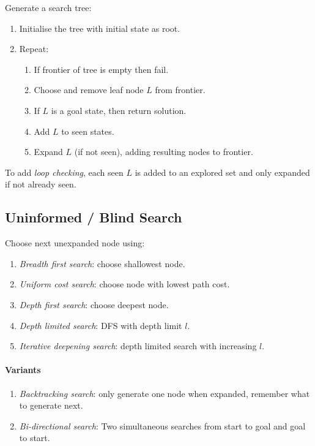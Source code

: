 \documentclass[twocolumn,english]{article}
\begin{document}
Generate a search tree:
\begin{enumerate}
\item Initialise the tree with initial state as root.
\item Repeat:
\begin{enumerate}
\item If frontier of tree is empty then fail.
\item Choose and remove leaf node $L$ from frontier.
\item If $L$ is a goal state, then return solution.
\item Add $L$ to seen states.
\item Expand $L$ (if not seen), adding resulting nodes to frontier.
\end{enumerate}
\end{enumerate}
To add \emph{loop checking}, each seen $L$ is added to an explored
set and only expanded if not already seen.

\subsection{Uninformed / Blind Search}

Choose next unexpanded node using:
\begin{enumerate}
\item \emph{Breadth first search}: choose shallowest node.
\item \emph{Uniform cost search}: choose node with lowest path cost.
\item \emph{Depth first search}: choose deepest node.
\item \emph{Depth limited search}: DFS with depth limit $l$.
\item \emph{Iterative deepening search}: depth limited search with increasing
$l$.
\end{enumerate}

\paragraph{Variants}
\begin{enumerate}
\item \emph{Backtracking search}: only generate one node when expanded,
remember what to generate next.
\item \emph{Bi-directional search}: Two simultaneous searches from start
to goal and goal to start.
\end{enumerate}
\end{document}
